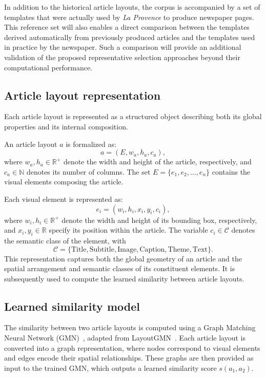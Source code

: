 \documentclass{ieeeaccess}
\begin{document}
In addition to the historical article layouts, the corpus is accompanied by a set of templates that were actually used by {\itshape La Provence} to produce newspaper pages. This reference set will also enables a direct comparison between the templates derived automatically from previously produced articles and the templates used in practice by the newspaper. Such a comparison will provide an additional validation of the proposed representative selection approaches beyond their computational performance.

\subsection{Article layout representation}
\label{sec:layout-representation}

Each article layout is represented as a structured object describing both its global properties and its internal composition.

An article layout $a$ is formalized as:
\[
a=(E,w_a,h_a,c_a),
\]
where $w_a,h_a\in\mathbb{R}^{+}$ denote the width and height of the article, respectively, and $c_a\in\mathbb{N}$ denotes its number of columns. The set $E=\{e_1,e_2,\dots,e_n\}$ contains the visual elements composing the article.

Each visual element is represented as:
\[
e_i=(w_i,h_i,x_i,y_i,c_i),
\]
where $w_i,h_i\in\mathbb{R}^{+}$ denote the width and height of its bounding box, respectively, and $x_i,y_i\in\mathbb{R}$ specify its position within the article. The variable $c_i\in\mathcal{C}$ denotes the semantic class of the element, with
\[
\mathcal{C}=
\{\text{Title},\text{Subtitle},\text{Image},\text{Caption},
\text{Theme},\text{Text}\}.
\]
This representation captures both the global geometry of an article and the spatial arrangement and semantic classes of its constituent elements. It is subsequently used to compute the learned similarity between article layouts.

\subsection{Learned similarity model}

The similarity between two article layouts is computed using a Graph Matching Neural Network (GMN)~\cite{gallardo-gmn}, adapted from LayoutGMN~\cite{patil2021layoutgmn}. Each article layout is converted into a graph representation, where nodes correspond to visual elements and edges encode their spatial relationships. These graphs are then provided as input to the trained GMN, which outputs a learned similarity score $s(a_1,a_2)$.
\end{document}
